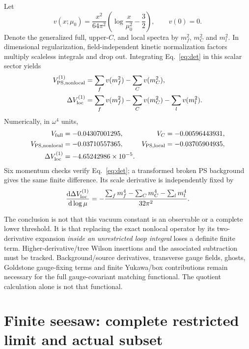 \documentclass[11pt]{article}
\newcommand{\dd}{\mathrm d}
\begin{document}
Let
\begin{equation}
 v(x;\mu_0)=\frac{x^2}{64\pi^2}
       \left(\log\frac{x}{\mu_0^2}-\frac32\right),\qquad v(0)=0.
\end{equation}
Denote the generalized full, upper-$C$, and local spectra by $m_f^2$,
$m_C^2$ and $m_l^2$. In dimensional regularization, field-independent
kinetic normalization factors multiply scaleless integrals and drop out.
Integrating Eq.~\eqref{eq:det} in this scalar sector yields
\begin{align}
 V^{(1)}_{\rm PS,nonlocal}&=\sum_fv(m_f^2)-\sum_Cv(m_C^2),\\
 \Delta V^{(1)}_{\rm loc}&=
 \sum_fv(m_f^2)-\sum_Cv(m_C^2)-\sum_lv(m_l^2).
 \label{eq:finite-subtraction}
\end{align}
Numerically, in $\omega^4$ units,
\begin{align}
 V_{\rm full}&=-0.04307001295,& V_C&=-0.00596443931,\\
 V_{\rm PS,nonlocal}&=-0.03710557365,&
 V_{\rm PS,local}&=-0.03705904935,\\
 \Delta V^{(1)}_{\rm loc}&=-4.65242986\times10^{-5}.&&
\end{align}
Six momentum checks verify Eq.~\eqref{eq:det}; a transformed broken PS
background gives the same finite difference. Its scale derivative is
independently fixed by
\begin{equation}
 \frac{\dd\Delta V^{(1)}_{\rm loc}}{\dd\log\mu}
 =-\frac{\sum_fm_f^4-\sum_Cm_C^4-\sum_lm_l^4}{32\pi^2}.
\end{equation}

The conclusion is not that this vacuum constant is an observable or a
complete lower threshold. It is that replacing the exact nonlocal
operator by its two-derivative expansion \emph{inside an unrestricted
loop integral} loses a definite finite term. Higher-derivative/tree
Wilson insertions and the associated subtraction must be tracked.
Background/source derivatives, transverse gauge fields, ghosts,
Goldstone gauge-fixing terms and finite Yukawa/box contributions remain
necessary for the full gauge-covariant matching functional. The quotient
calculation alone is not that functional.

\section{Finite seesaw: complete restricted limit and actual subset}
\end{document}
